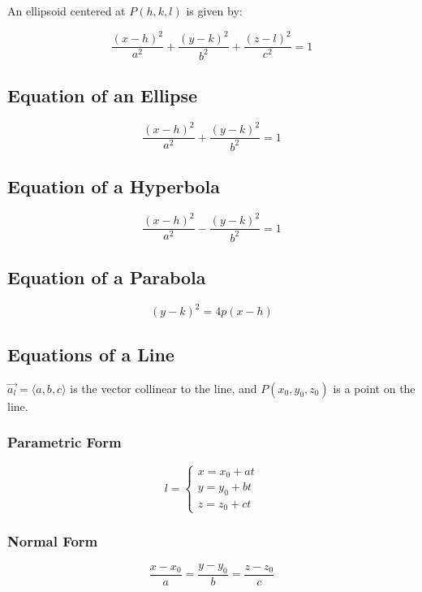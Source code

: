 \documentclass[a4paper,12pt,openany]{book}
\begin{document}
An ellipsoid centered at \(P(h, k, l)\) is given by:

\begin{equation}
    \dfrac{(x-h)^2}{a^2} +  
    \dfrac{(y-k)^2}{b^2} + 
    \dfrac{(z-l)^2}{c^2} = 1
\end{equation}

\subsection{Equation of an Ellipse}
\begin{equation}
    \dfrac{(x-h)^2}{a^2} + \dfrac{(y-k)^2}{b^2} = 1
\end{equation}

\subsection{Equation of a Hyperbola}
\begin{equation}
    \dfrac{(x-h)^2}{a^2} - \dfrac{(y-k)^2}{b^2} = 1
\end{equation}
\subsection{Equation of a Parabola}
\begin{equation}
    (y-k)^2 = 4p(x-h)
\end{equation}

\subsection{Equations of a Line}
\(\vec{a_l} = \langle a, b, c \rangle\) is the vector collinear to the line, and \(P(x_0, y_0, z_0)\) is a point on the line.
\subsubsection{Parametric Form}
\begin{equation}
    l = 
    \begin{cases}
        x = x_0 + at\\
        y = y_0 + bt\\
        z = z_0 + ct
    \end{cases}
\end{equation}

\subsubsection{Normal Form}
\begin{equation}
    \dfrac{x-x_0}{a} = \dfrac{y-y_0}{b} = \dfrac{z-z_0}{c}
\end{equation}
\end{document}
